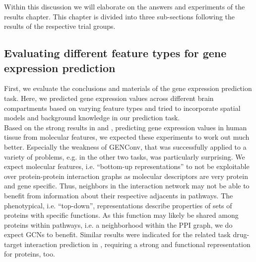 \documentclass[]{article}
\begin{document}
Within this discussion we will elaborate on the answers and experiments of the results chapter. This chapter is divided into three sub-sections following the results of the respective trial groups. 

\subsection{Evaluating different feature types for gene expression prediction}
\label{sec:disc_genexp}
First, we evaluate the conclusions and materials of the gene expression prediction task. Here, we predicted gene expression values across different brain compartments based on varying feature types and tried to incorporate spatial models and background knowledge in our prediction task. \\

Based on the strong results in \citet{schulte2021integration} and \citet{wang2021mogonet}, predicting gene expression values in human tissue from molecular features, we expected these experiments to work out much better. Especially the weakness of GENConv, that was successfully applied to a variety of problems, e.g. in the other two tasks, was particularly surprising. 
We expect molecular features, i.e. ``bottom-up representations'' to not be exploitable over protein-protein interaction graphs as molecular descriptors are very protein and gene specific. Thus, neighbors in the interaction network may not be able to benefit from information about their respective adjacents in pathways. The phenotypical, i.e. ``top-down'', representations describe properties of sets of proteins with specific functions. As this function may likely be shared among proteins within pathways, i.e. a neighborhood within the PPI graph, we do expect GCNs to benefit. Similar results were indicated for the related task drug-target interaction prediction in \citet{hinnerichs2021dti}, requiring a strong and functional representation for proteins, too. \\
\end{document}
